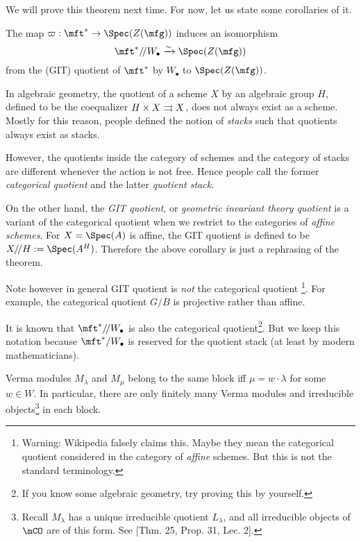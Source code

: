 	We will prove this theorem next time. For now, let us state some corollaries of it.

\begin{cor}
	\label{cor-HC}
	The map $\varpi:\mft^* \to \Spec(Z(\mfg))$ induces an isomorphism
	\[
		\mft^*/\!/W_\bullet \xrightarrow{\sim} \Spec(Z(\mfg))
	\]
	from the (GIT) quotient of $\mft^*$ by $W_\bullet$ to $\Spec(Z(\mfg))$.
\end{cor}

\begin{rem}
	In algebraic geometry, the quotient of a scheme $X$ by an algebraic group $H$, defined to be the coequalizer $H\mt X \rightrightarrows X$, does not always exist as a scheme. Mostly for this reason, people defined the notion of \emph{stacks} such that quotients always exist as stacks.

	However, the quotients inside the category of schemes and the category of stacks are different whenever the action is not free. Hence people call the former \emph{categorical quotient} and the latter \emph{quotient stack}. 

	On the other hand, the \emph{GIT quotient}, or \emph{geometric invariant theory quotient} is a variant of the categorical quotient when we restrict to the categories of \emph{affine schemes}. For $X=\Spec(A)$ is affine, the GIT quotient is defined to be $X/\!/H:=\Spec(A^H)$. Therefore the above corollary is just a rephrasing of the theorem.

	Note however in general GIT quotient is \emph{not} the categorical quotient \footnote{Warning: Wikipedia falsely claims this. Maybe they mean the categorical quotient considered in the category of \emph{affine} schemes. But this is not the standard terminology.}. For example, the categorical quotient $G/B$ is projective rather than affine.

	It is known that $\mft^*/\!/W_\bullet$ is also the categorical quotient\footnote{If you know some algebraic geometry, try proving this by yourself.}. But we keep this notation because $\mft^*/W_\bullet$ is reserved for the quotient stack (at least by modern mathematicians).
\end{rem}

\begin{prop}
	Verma modules $M_\lambda$ and $M_\mu$ belong to the same block iff $\mu = w\cdot \lambda$ for some $w\in W$. In particular, there are only finitely many Verma modules and irreducible objects\footnote{Recall $M_\lambda$ has a unique irreducible quotient $L_\lambda$, and all irreducible objects of $\mCO$ are of this form. See [Thm. 25, Prop. 31, Lec. 2].} in each block.
\end{prop}


